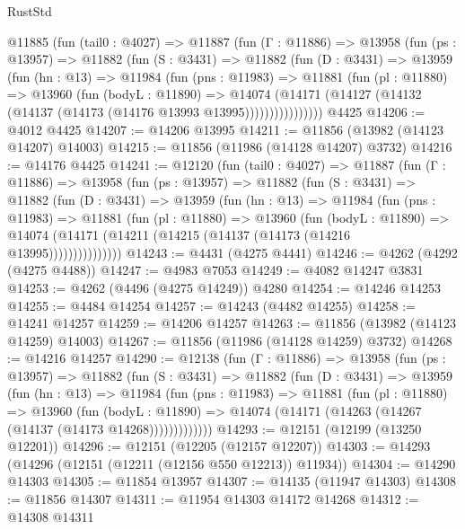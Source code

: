 \begin{lexlean}{RustStd}
\begin{coremodule}
    @11885
      (fun (tail0 : @4027) =>
      @11887
        (fun (Γ : @11886) =>
        @13958
          (fun (ps : @13957) =>
          @11882
            (fun (S : @3431) =>
            @11882
              (fun (D : @3431) =>
              @13959
                (fun (hn : @13) =>
                @11984
                  (fun (pns : @11983) =>
                  @11881
                    (fun (pl : @11880) =>
                    @13960
                      (fun (bodyL : @11890) =>
                      @14074
                        (@14171
                          (@14127 (@14132 (@14137 (@14173 (@14176 @13993 @13995))))))))))))))))
    @4425
@14206 := @4012 @4425
@14207 := @14206 @13995
@14211 := @11856 (@13982 (@14123 @14207) @14003)
@14215 := @11856 (@11986 (@14128 @14207) @3732)
@14216 := @14176 @4425
@14241 := @12120
    (fun (tail0 : @4027) =>
    @11887
      (fun (Γ : @11886) =>
      @13958
        (fun (ps : @13957) =>
        @11882
          (fun (S : @3431) =>
          @11882
            (fun (D : @3431) =>
            @13959
              (fun (hn : @13) =>
              @11984
                (fun (pns : @11983) =>
                @11881
                  (fun (pl : @11880) =>
                  @13960
                    (fun (bodyL : @11890) =>
                    @14074 (@14171 (@14211 (@14215 (@14137 (@14173 (@14216 @13995)))))))))))))))
@14243 := @4431 (@4275 @4441)
@14246 := @4262 (@4292 (@4275 @4488))
@14247 := @4983 @7053
@14249 := @4082 @14247 @3831
@14253 := @4262 (@4496 (@4275 @14249)) @4280
@14254 := @14246 @14253
@14255 := @4484 @14254
@14257 := @14243 (@4482 @14255)
@14258 := @14241 @14257
@14259 := @14206 @14257
@14263 := @11856 (@13982 (@14123 @14259) @14003)
@14267 := @11856 (@11986 (@14128 @14259) @3732)
@14268 := @14216 @14257
@14290 := @12138
    (fun (Γ : @11886) =>
    @13958
      (fun (ps : @13957) =>
      @11882
        (fun (S : @3431) =>
        @11882
          (fun (D : @3431) =>
          @13959
            (fun (hn : @13) =>
            @11984
              (fun (pns : @11983) =>
              @11881
                (fun (pl : @11880) =>
                @13960
                  (fun (bodyL : @11890) =>
                  @14074 (@14171 (@14263 (@14267 (@14137 (@14173 @14268)))))))))))))
@14293 := @12151 (@12199 (@13250 @12201))
@14296 := @12151 (@12205 (@12157 @12207))
@14303 := @14293 (@14296 (@12151 (@12211 (@12156 @550 @12213)) @11934))
@14304 := @14290 @14303
@14305 := @11854 @13957
@14307 := @14135 (@11947 @14303)
@14308 := @11856 @14307
@14311 := @11954 @14303 @14172 @14268
@14312 := @14308 @14311

\end{coremodule}
\end{lexlean}
